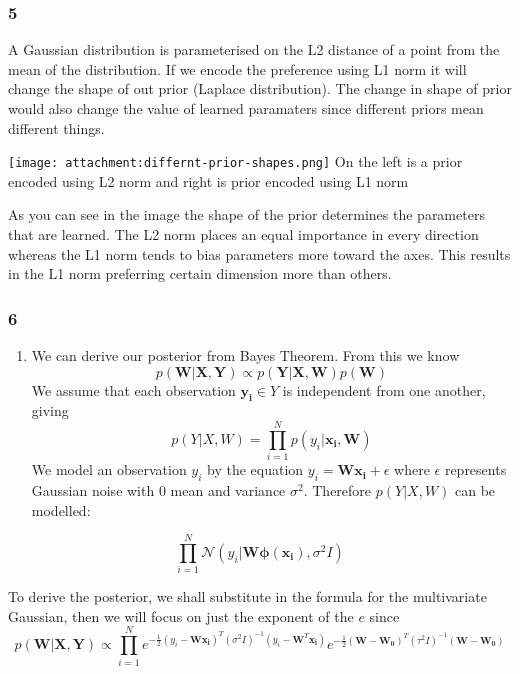\documentclass[11pt]{article}
\providecommand{\tightlist}{%
      \setlength{\itemsep}{0pt}\setlength{\parskip}{0pt}}
\begin{document}
    \subsubsection{5}\label{section}

A Gaussian distribution is parameterised on the L2 distance of a point
from the mean of the distribution. If we encode the preference using L1
norm it will change the shape of out prior (Laplace distribution). The
change in shape of prior would also change the value of learned
paramaters since different priors mean different things.

\texttt{[image: attachment:differnt-prior-shapes.png]} On the left is a
prior encoded using L2 norm and right is prior encoded using L1 norm

As you can see in the image the shape of the prior determines the
parameters that are learned. The L2 norm places an equal importance in
every direction whereas the L1 norm tends to bias parameters more toward
the axes. This results in the L1 norm preferring certain dimension more
than others.

    \subsubsection{6}\label{section}

\begin{enumerate}
\def\labelenumi{\alph{enumi})}
\tightlist
\item
  We can derive our posterior from Bayes Theorem. From this we know
  \[ p(\boldsymbol{W} | \boldsymbol{X}, \boldsymbol{Y}) \propto p(\boldsymbol{Y} | \boldsymbol{X}, \boldsymbol{W})p(\boldsymbol{W}) \]
  We assume that each observation \(\boldsymbol{y_i} \in Y\) is
  independent from one another, giving
  \[ p(Y | X, W) = \prod^{N}_{i=1} p(y_i | \boldsymbol{x_i}, \boldsymbol{W}) \]
  We model an observation \(y_i\) by the equation
  \(y_i = \boldsymbol{W} \boldsymbol{x_i} + \epsilon\) where
  \(\epsilon\) represents Gaussian noise with \(0\) mean and variance
  \(\sigma^2\). Therefore \(p(Y | X, W)\) can be modelled:
\end{enumerate}

\[ \prod^N_{i=1} \mathcal{N}(y_i | \boldsymbol{W} \boldsymbol{\phi (x_i)}, \sigma^2 I)\]

To derive the posterior, we shall substitute in the formula for the
multivariate Gaussian, then we will focus on just the exponent of the
\(e\) since
\[p(\boldsymbol{W}| \boldsymbol{X}, \boldsymbol{Y}) \propto \prod^N_{i=1} e^{-\frac{1}{2}(y_i - \boldsymbol{W} \boldsymbol{x_i})^T(\sigma^2 I)^{-1}(y_i - \boldsymbol{W}^T \boldsymbol{x_i})} e^{-\frac{1}{2}(\boldsymbol{W} - \boldsymbol{W_0})^T(\tau^2 I)^{-1}(\boldsymbol{W}-\boldsymbol{W_0})}\]
\end{document}
